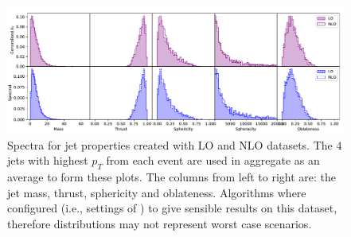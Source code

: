 \begin{figure}[htp]
    \includegraphics[width=\textwidth]{graphics/array_of_variables2_filled}
    \caption{Spectra for jet properties created with LO and NLO datasets.
             The \(4\) jets with highest \(p_T\) from each event are used in aggregate as an average to 
             form these plots.
             The columns from left to right are: the jet mass, 
             thrust, sphericity and oblateness.
             Algorithms where configured (i.e., settings of \stoppingdeltar{})
             to give sensible results on
             this dataset, therefore distributions may not represent worst case scenarios.
         }\label{fig:IRC_singles2}

\end{figure}
